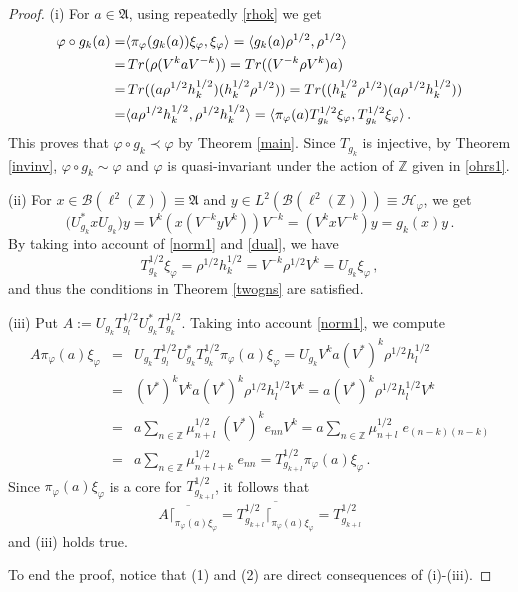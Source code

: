 \documentclass[10pt,a4paper]{amsart}
\def\bz{{\mathbb Z}}
\def\cb{{\mathcal B}}
\def\ch{{\mathcal H}}
\def\f{\varphi}\def\ff{\phi} \def\F{\Phi}
\def\ga{{\mathfrak A}} \def\gpa{{\mathfrak a}}
\def\tr{\mathop{\rm Tr}}
\begin{document}
\begin{proof}
(i) For $a\in\ga$, using repeatedly \eqref{rhok} we get
\begin{align*}
\f\circ g_k(a)=&\langle \pi_\f(g_k(a))\xi_\f,\xi_\f\rangle
              =\langle g_k(a)\rho^{1/2},\rho^{1/2}\rangle\\
							=&\tr(\rho(V^{k}aV^{-k}))
							=\tr((V^{-k}\rho V^{k})a)\\
							=&\tr((a\rho^{1/2}h_k^{1/2})(h_k^{1/2}\rho^{1/2}))
							=\tr((h_k^{1/2}\rho^{1/2})(a\rho^{1/2}h_k^{1/2}))\\
							=&\langle a\rho^{1/2}h_k^{1/2},\rho^{1/2}h_k^{1/2}\rangle
							=\langle \pi_\f(a)T^{1/2}_{g_k}\xi_\f,T^{1/2}_{g_k}\xi_\f\rangle\,.
\end{align*}
This proves that $\f\circ g_k\prec \f$ by Theorem \ref{main}. Since $T_{g_k}$ is injective, by Theorem \ref{invinv}, $\f\circ g_k\sim\f$ and $\f$ is quasi-invariant under the action of $\bz$ given in \eqref{ohrs1}.

(ii) For $x\in\cb(\ell^2(\mathbb Z))\equiv\ga$ and $y\in L^2(\cb(\ell^2(\mathbb Z)))\equiv\ch_\f$, we get
$$
\big(U_{g_k}^*xU_{g_k}\big)y=V^k(x(V^{-k}yV^k))V^{-k}=(V^k xV^{-k})y=g_k(x)y\,.
$$
By taking into account of \eqref{norm1} and \eqref{dual}, we have
$$
T^{1/2}_{g_k}\xi_\f=\rho^{1/2}h_k^{1/2}=V^{-k}\rho^{1/2} V^k=U_{g_k}\xi_\f\,,
$$
and thus the conditions in Theorem \ref{twogns} are satisfied.

(iii) Put $A:=U_{g_k}T_{g_l}^{1/2}U_{g_k}^*T_{g_k}^{1/2}$. Taking into account \eqref{norm1},
we compute
\begin{eqnarray*}
A\pi_\f(a)\xi_\f&=&U_{g_k}T^{1/2}_{g_l}U_{g_k}^*T_{g_k}^{1/2}\pi_\f(a)\xi_\f
                  =U_{g_k}V^ka(V^*)^k\rho^{1/2}h_l^{1/2}\\
									&=&(V^*)^{k}V^ka(V^*)^k\rho^{1/2}h_l^{1/2}V^k
									=a(V^*)^k\rho^{1/2}h_l^{1/2}V^k\\
									&=&a\sum_{n\in\mathbb Z}\mu_{n+l}^{1/2}\;(V^*)^ke_{nn}V^k
									=a\sum_{n\in\mathbb Z}\mu_{n+l}^{1/2}\;e_{(n-k)(n-k)}\\
									&=&a\sum_{n\in\mathbb Z}\mu_{n+l+k}^{1/2}\;e_{nn}
									=T^{1/2}_{g_{k+l}}\pi_\f(a)\xi_\f\,.
\end{eqnarray*}
Since $\pi_\f(a)\xi_\f$ is a core for $T^{1/2}_{g_{k+l}}$, it follows that 
$$
\overline{A\lceil_{\pi_\f(a)\xi_\f}}=\overline{T^{1/2}_{g_{k+l}}\lceil_{\pi_\f(a)\xi_\f}}=T^{1/2}_{g_{k+l}}
$$ 
and (iii) holds true.

To end the proof, notice that (1) and (2) are direct consequences of (i)-(iii).
\end{proof}
\end{document}
